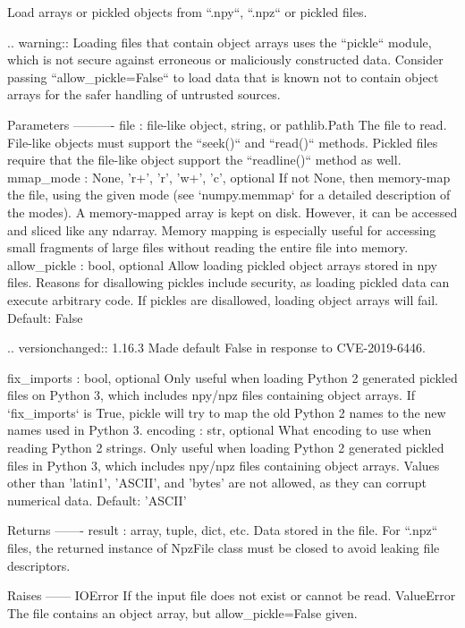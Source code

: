 \begin{DoxyVerb}Load arrays or pickled objects from ``.npy``, ``.npz`` or pickled files.

.. warning:: Loading files that contain object arrays uses the ``pickle``
             module, which is not secure against erroneous or maliciously
             constructed data. Consider passing ``allow_pickle=False`` to
             load data that is known not to contain object arrays for the
             safer handling of untrusted sources.

Parameters
----------
file : file-like object, string, or pathlib.Path
    The file to read. File-like objects must support the
    ``seek()`` and ``read()`` methods. Pickled files require that the
    file-like object support the ``readline()`` method as well.
mmap_mode : {None, 'r+', 'r', 'w+', 'c'}, optional
    If not None, then memory-map the file, using the given mode (see
    `numpy.memmap` for a detailed description of the modes).  A
    memory-mapped array is kept on disk. However, it can be accessed
    and sliced like any ndarray.  Memory mapping is especially useful
    for accessing small fragments of large files without reading the
    entire file into memory.
allow_pickle : bool, optional
    Allow loading pickled object arrays stored in npy files. Reasons for
    disallowing pickles include security, as loading pickled data can
    execute arbitrary code. If pickles are disallowed, loading object
    arrays will fail. Default: False

    .. versionchanged:: 1.16.3
        Made default False in response to CVE-2019-6446.

fix_imports : bool, optional
    Only useful when loading Python 2 generated pickled files on Python 3,
    which includes npy/npz files containing object arrays. If `fix_imports`
    is True, pickle will try to map the old Python 2 names to the new names
    used in Python 3.
encoding : str, optional
    What encoding to use when reading Python 2 strings. Only useful when
    loading Python 2 generated pickled files in Python 3, which includes
    npy/npz files containing object arrays. Values other than 'latin1',
    'ASCII', and 'bytes' are not allowed, as they can corrupt numerical
    data. Default: 'ASCII'

Returns
-------
result : array, tuple, dict, etc.
    Data stored in the file. For ``.npz`` files, the returned instance
    of NpzFile class must be closed to avoid leaking file descriptors.

Raises
------
IOError
    If the input file does not exist or cannot be read.
ValueError
    The file contains an object array, but allow_pickle=False given.


\end{DoxyVerb}
